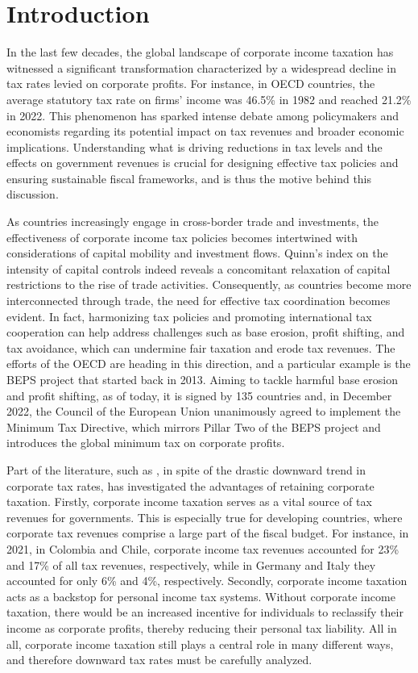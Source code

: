 \chapter{Introduction}

In the last few decades, the global landscape of corporate income taxation has witnessed a significant transformation characterized by a widespread decline in tax rates levied on corporate profits. For instance, in OECD countries, the average statutory tax rate on firms' income was 46.5\% in 1982 and reached 21.2\% in 2022. This phenomenon has sparked intense debate among policymakers and economists regarding its potential impact on tax revenues and broader economic implications. Understanding what is driving reductions in tax levels and the effects on government revenues is crucial for designing effective tax policies and ensuring sustainable fiscal frameworks, and is thus the motive behind this discussion.

As countries increasingly engage in cross-border trade and investments, the effectiveness of corporate income tax policies becomes intertwined with considerations of capital mobility and investment flows. Quinn's index on the intensity of capital controls indeed reveals a concomitant relaxation of capital restrictions to the rise of trade activities. Consequently, as countries become more interconnected through trade, the need for effective tax coordination becomes evident. In fact, harmonizing tax policies and promoting international tax cooperation can help address challenges such as base erosion, profit shifting, and tax avoidance, which can undermine fair taxation and erode tax revenues. The efforts of the OECD are heading in this direction, and a particular example is the BEPS project that started back in 2013. Aiming to tackle harmful base erosion and profit shifting, as of today, it is signed by 135 countries and, in December 2022, the Council of the European Union unanimously agreed to implement the Minimum Tax Directive, which mirrors Pillar Two of the BEPS project and introduces the global minimum tax on corporate profits.

Part of the literature, such as \textcite{weichenrieder}, in spite of the drastic downward trend in corporate tax rates, has investigated the advantages of retaining corporate taxation. Firstly, corporate income taxation serves as a vital source of tax revenues for governments. This is especially true for developing countries, where corporate tax revenues comprise a large part of the fiscal budget. For instance, in 2021, in Colombia and Chile, corporate income tax revenues accounted for 23\% and 17\% of all tax revenues, respectively, while in Germany and Italy they accounted for only 6\% and 4\%, respectively. Secondly, corporate income taxation acts as a backstop for personal income tax systems. Without corporate income taxation, there would be an increased incentive for individuals to reclassify their income as corporate profits, thereby reducing their personal tax liability. All in all, corporate income taxation still plays a central role in many different ways, and therefore downward tax rates must be carefully analyzed.

